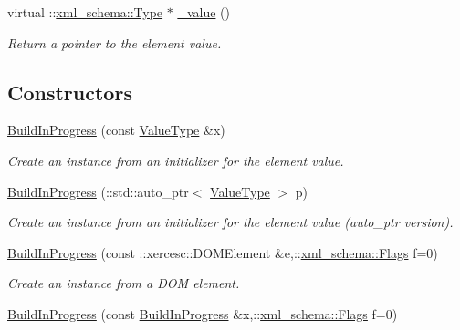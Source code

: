 \begin{DoxyCompactItemize}
virtual ::\hyperlink{namespacexml__schema_ad34e8fd175bf4f9fece6c670b01aa239}{xml\_\-schema::Type} $\ast$ \hyperlink{classopenstack_1_1xml_1_1BuildInProgress_aee88bde01cc55f0b73cfff56d0fabbbc}{\_\-value} ()
\begin{DoxyCompactList}\small\item\em Return a pointer to the element value. \item\end{DoxyCompactList}\end{DoxyCompactItemize}
\subsection*{Constructors}
\begin{DoxyCompactItemize}
\item 
\hyperlink{classopenstack_1_1xml_1_1BuildInProgress_a094d388806e633994ef8f720fdd21047}{BuildInProgress} (const \hyperlink{classopenstack_1_1xml_1_1BuildInProgressAPIFault}{ValueType} \&x)
\begin{DoxyCompactList}\small\item\em Create an instance from an initializer for the element value. \item\end{DoxyCompactList}\item 
\hyperlink{classopenstack_1_1xml_1_1BuildInProgress_ab4489cc88886cbda0e90984552cb9235}{BuildInProgress} (::std::auto\_\-ptr$<$ \hyperlink{classopenstack_1_1xml_1_1BuildInProgressAPIFault}{ValueType} $>$ p)
\begin{DoxyCompactList}\small\item\em Create an instance from an initializer for the element value (auto\_\-ptr version). \item\end{DoxyCompactList}\item 
\hyperlink{classopenstack_1_1xml_1_1BuildInProgress_a093d752068c939894f262bf667166ec3}{BuildInProgress} (const ::xercesc::DOMElement \&e,::\hyperlink{namespacexml__schema_affb4c227cbd9aa7453dd1dc5a1401943}{xml\_\-schema::Flags} f=0)
\begin{DoxyCompactList}\small\item\em Create an instance from a DOM element. \item\end{DoxyCompactList}\item 
\hyperlink{classopenstack_1_1xml_1_1BuildInProgress_aa82743c9378c5b0ae0591b585ed9a631}{BuildInProgress} (const \hyperlink{classopenstack_1_1xml_1_1BuildInProgress}{BuildInProgress} \&x,::\hyperlink{namespacexml__schema_affb4c227cbd9aa7453dd1dc5a1401943}{xml\_\-schema::Flags} f=0)

\end{DoxyCompactItemize}
